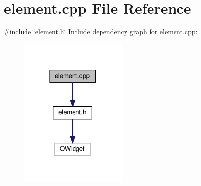 \section{element.\+cpp File Reference}
\label{element_8cpp}
{\ttfamily \#include \char`\"{}element.\+h\char`\"{}}\newline
Include dependency graph for element.\+cpp\+:\nopagebreak
\begin{figure}[H]
\begin{center}
\leavevmode
\includegraphics[width=150pt]{element_8cpp__incl}
\end{center}
\end{figure}
